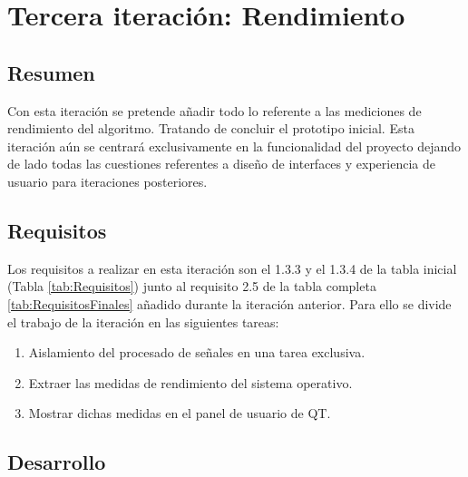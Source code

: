 
\section{Tercera iteración: Rendimiento}
    \subsection{Resumen}
        
        Con esta iteración se pretende añadir todo lo referente a las mediciones de rendimiento del algoritmo. Tratando de concluir el prototipo inicial. Esta iteración aún se centrará exclusivamente en la funcionalidad del proyecto dejando de lado todas las cuestiones referentes a diseño de interfaces y experiencia de usuario para iteraciones posteriores.
        
    \subsection{Requisitos}

        Los requisitos a realizar en esta iteración son el 1.3.3 y el 1.3.4 de la tabla inicial (Tabla \ref{tab:Requisitos}) junto al requisito 2.5 de la tabla completa \ref{tab:RequisitosFinales} añadido durante la iteración anterior. Para ello se divide el trabajo de la iteración en las siguientes tareas:

        \begin{enumerate}
            \item Aislamiento del procesado de señales en una tarea exclusiva.
            \item Extraer las medidas de rendimiento del sistema operativo.
            \item Mostrar dichas medidas en el panel de usuario de QT.
        \end{enumerate}
        
    \subsection{Desarrollo}
        
